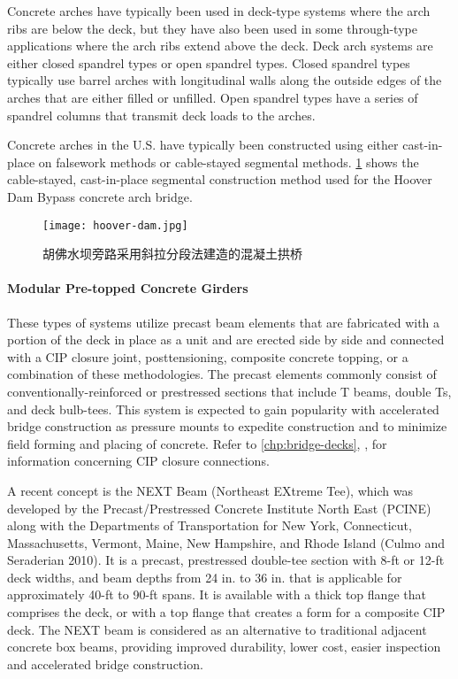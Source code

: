 Concrete arches have typically been used in deck-type systems where the arch ribs are below the deck, but they
have also been used in some through-type applications where the arch ribs extend above the deck. Deck arch
systems are either closed spandrel types or open spandrel types. Closed spandrel types typically use barrel arches
with longitudinal walls along the outside edges of the arches that are either filled or unfilled. Open spandrel types
have a series of spandrel columns that transmit deck loads to the arches.


Concrete arches in the U.S. have typically been constructed using either cast-in-place on falsework methods or cable-stayed segmental methods. \cref{fig:hoover-dam} shows the cable-stayed, cast-in-place segmental construction method used for the Hoover Dam Bypass concrete arch bridge.

\begin{figure}
  \texttt{[image: hoover-dam.jpg]}
  \caption{胡佛水坝旁路采用斜拉分段法建造的混凝土拱桥}
  \label{fig:hoover-dam}
\end{figure}

\paragraph{Modular Pre-topped Concrete Girders}

These types of systems utilize precast beam elements that are fabricated with a portion of the deck in place as a unit and are erected side by side and connected with a CIP closure joint, posttensioning, composite concrete topping, or a combination of these methodologies. The precast elements commonly consist of conventionally-reinforced or prestressed sections that include T beams, double Ts, and deck bulb-tees. This system is expected to gain popularity with accelerated bridge construction as pressure mounts to expedite construction and to minimize field forming and placing of concrete. Refer to \cref{chp:bridge-decks}, , for information concerning CIP closure connections.

A recent concept is the NEXT Beam (Northeast EXtreme Tee), which was developed by the Precast/Prestressed Concrete Institute North East (PCINE) along with the Departments of Transportation for New York, Connecticut, Massachusetts, Vermont, Maine, New Hampshire, and Rhode Island (Culmo and Seraderian 2010). It is a precast, prestressed double-tee section with 8-ft or 12-ft deck widths, and beam depths from 24 in. to 36 in. that is applicable for approximately 40-ft to 90-ft spans. It is available with a thick top flange that comprises the deck, or with a top flange that creates a form for a composite CIP deck. The NEXT beam is considered as an alternative to traditional adjacent concrete box beams, providing improved durability, lower cost, easier inspection and accelerated bridge construction.

